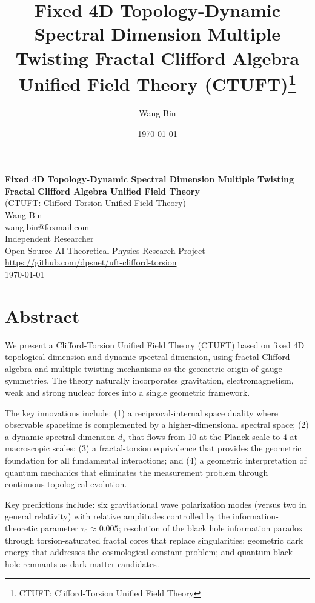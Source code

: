 \documentclass[preprint,12pt,a4paper]{revtex4-2}
\title{Fixed 4D Topology-Dynamic Spectral Dimension Multiple Twisting Fractal Clifford Algebra Unified Field Theory (CTUFT)\footnote{CTUFT: Clifford-Torsion Unified Field Theory}}
\author{Wang Bin}
\affiliation{Independent Researcher}
\affiliation{Open Source AI Theoretical Physics Research Project}
\affiliation{\url{https://github.com/dpsnet/uft-clifford-torsion}}
\date{\today}
\theoremstyle{definition}
\theoremstyle{remark}
\begin{document}
\begin{titlepage}
\centering
\vspace*{3cm}
{\LARGE\bfseries Fixed 4D Topology-Dynamic Spectral Dimension Multiple Twisting Fractal Clifford Algebra Unified Field Theory\\[0.5em]}
{\large (CTUFT: Clifford-Torsion Unified Field Theory)\\[2cm]}
{\large Wang Bin\\[0.5cm]}
{\small wang.bin@foxmail.com\\[0.3cm]}
{\small Independent Researcher\\[0.3cm]}
{\small Open Source AI Theoretical Physics Research Project\\[0.3cm]}
{\small \url{https://github.com/dpsnet/uft-clifford-torsion}\\[2cm]}
{\large \today}
\end{titlepage}

\section*{Abstract}

We present a Clifford-Torsion Unified Field Theory (CTUFT) based on fixed 4D topological dimension and dynamic spectral dimension, using fractal Clifford algebra and multiple twisting mechanisms as the geometric origin of gauge symmetries. The theory naturally incorporates gravitation, electromagnetism, weak and strong nuclear forces into a single geometric framework.

The key innovations include: (1) a reciprocal-internal space duality where observable spacetime is complemented by a higher-dimensional spectral space; (2) a dynamic spectral dimension $d_s$ that flows from 10 at the Planck scale to 4 at macroscopic scales; (3) a fractal-torsion equivalence that provides the geometric foundation for all fundamental interactions; and (4) a geometric interpretation of quantum mechanics that eliminates the measurement problem through continuous topological evolution.

Key predictions include: six gravitational wave polarization modes (versus two in general relativity) with relative amplitudes controlled by the information-theoretic parameter $\tau_0 \approx 0.005$; resolution of the black hole information paradox through torsion-saturated fractal cores that replace singularities; geometric dark energy that addresses the cosmological constant problem; and quantum black hole remnants as dark matter candidates.
\end{document}
